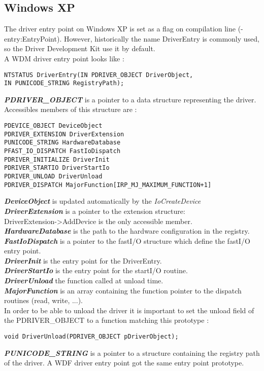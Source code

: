 \documentclass[11pt]{report}
\begin{document}
  \subsection{Windows XP}
  The driver entry point on Windows XP is set as a flag on compilation line
  (-entry:EntryPoint).
  However, historically the name DriverEntry is commonly used, so the Driver Development Kit use
  it by default.\\
  A WDM driver entry point looks like :
    \begin{lstlisting}    
NTSTATUS DriverEntry(IN PDRIVER_OBJECT DriverObject,
IN PUNICODE_STRING RegistryPath);
    \end{lstlisting}
{\bf \it PDRIVER\_OBJECT} is a pointer to a data structure representing the driver.
Accessibles members of this structure are :
    \begin{lstlisting}
PDEVICE_OBJECT DeviceObject
PDRIVER_EXTENSION DriverExtension
PUNICODE_STRING HardwareDatabase
PFAST_IO_DISPATCH FastIoDispatch
PDRIVER_INITIALIZE DriverInit
PDRIVER_STARTIO DriverStartIo
PDRIVER_UNLOAD DriverUnload
PDRIVER_DISPATCH MajorFunction[IRP_MJ_MAXIMUM_FUNCTION+1]
    \end{lstlisting}
{\bf \it DeviceObject} is updated automatically by the {\it IoCreateDevice}\\
{\bf \it DriverExtension} is a pointer to the extension structure:\\
DriverExtension-\textgreater AddDevice is the only accessible member.\\
{\bf \it HardwareDatabase} is the path to the hardware configuration in the registry.\\
{\bf \it FastIoDispatch} is a pointer to the fastI/O structure which define the fastI/O entry point.\\
{\bf \it DriverInit} is the entry point for the DriverEntry.\\
{\bf \it DriverStartIo} is the entry point for the startI/O routine.\\
{\bf \it DriverUnload} the function called at unload time.\\
{\bf \it MajorFunction} is an array containing the function pointer to the
dispatch routines (read, write, ...).\\
In order to be able to unload the driver it is important to set the unload
field of the PDRIVER\_OBJECT to a function matching this prototype :
	\begin{lstlisting}
void DriverUnload(PDRIVER_OBJECT pDriverObject);
    \end{lstlisting}
  {\bf \it PUNICODE\_STRING} is a pointer to a structure containing the registry path of the driver.
  A WDF driver entry point got the same entry point prototype.
\end{document}
